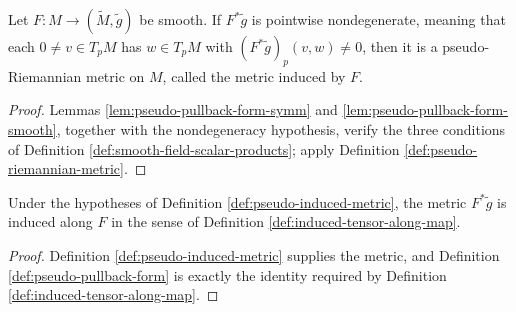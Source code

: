 \begin{definition}
\label{def:pseudo-induced-metric}





Let $F:M\to(\widetilde M,\widetilde g)$ be smooth. If $F^*\widetilde g$ is pointwise nondegenerate, meaning that each $0\ne v\in T_pM$ has $w\in T_pM$ with $(F^*\widetilde g)_p(v,w)\ne0$, then it is a pseudo-Riemannian metric on $M$, called the metric induced by $F$.
\end{definition}
\begin{proof}

\sketch Lemmas \ref{lem:pseudo-pullback-form-symm} and \ref{lem:pseudo-pullback-form-smooth}, together with the nondegeneracy hypothesis, verify the three conditions of Definition \ref{def:smooth-field-scalar-products}; apply Definition \ref{def:pseudo-riemannian-metric}.
\end{proof}

\begin{lemma}
\label{lem:pseudo-riemannian-submanifold-induced-tensor}





Under the hypotheses of Definition \ref{def:pseudo-induced-metric}, the metric $F^*\widetilde g$ is induced along $F$ in the sense of Definition \ref{def:induced-tensor-along-map}.
\end{lemma}
\begin{proof}

\sketch Definition \ref{def:pseudo-induced-metric} supplies the metric, and Definition \ref{def:pseudo-pullback-form} is exactly the identity required by Definition \ref{def:induced-tensor-along-map}.
\end{proof}

